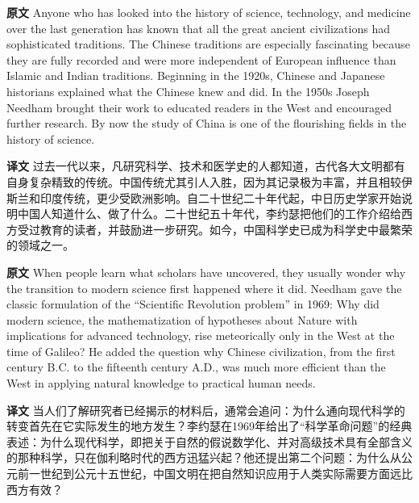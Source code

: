 \documentclass[UTF8,zihao=-4]{ctexart}
\newcommand{\BodyFont}{\fontsize{10.5pt}{15.5pt}\selectfont}
\newcommand{\origlabel}{\textbf{原文}\quad}
\newcommand{\translabel}{\textbf{译文}\quad}
\newenvironment{enblock}{\par\noindent\begingroup\BodyFont\origlabel}{\par\endgroup}
\newenvironment{zhblock}{\par\noindent\begingroup\BodyFont\translabel}{\par\endgroup\vspace{0.35em}}
\begin{document}
\begin{enblock}
Anyone who has looked into the history of science, technology, and medicine over the last generation has known that all the great ancient civilizations had sophisticated traditions. The Chinese traditions are especially fascinating because they are fully recorded and were more independent of European influence than Islamic and Indian traditions. Beginning in the 1920s, Chinese and Japanese historians explained what the Chinese knew and did. In the 1950s Joseph Needham brought their work to educated readers in the West and encouraged further research. By now the study of China is one of the flourishing fields in the history of science.
\end{enblock}
\begin{zhblock}
过去一代以来，凡研究科学、技术和医学史的人都知道，古代各大文明都有自身复杂精致的传统。中国传统尤其引人入胜，因为其记录极为丰富，并且相较伊斯兰和印度传统，更少受欧洲影响。自二十世纪二十年代起，中日历史学家开始说明中国人知道什么、做了什么。二十世纪五十年代，李约瑟把他们的工作介绍给西方受过教育的读者，并鼓励进一步研究。如今，中国科学史已成为科学史中最繁荣的领域之一。
\end{zhblock}

\begin{enblock}
When people learn what scholars have uncovered, they usually wonder why the transition to modern science first happened where it did. Needham gave the classic formulation of the ``Scientific Revolution problem'' in 1969: Why did modern science, the mathematization of hypotheses about Nature with implications for advanced technology, rise meteorically only in the West at the time of Galileo? He added the question why Chinese civilization, from the first century B.C. to the fifteenth century A.D., was much more efficient than the West in applying natural knowledge to practical human needs.
\end{enblock}
\begin{zhblock}
当人们了解研究者已经揭示的材料后，通常会追问：为什么通向现代科学的转变首先在它实际发生的地方发生？李约瑟在1969年给出了“科学革命问题”的经典表述：为什么现代科学，即把关于自然的假说数学化、并对高级技术具有全部含义的那种科学，只在伽利略时代的西方迅猛兴起？他还提出第二个问题：为什么从公元前一世纪到公元十五世纪，中国文明在把自然知识应用于人类实际需要方面远比西方有效？
\end{zhblock}
\end{document}
